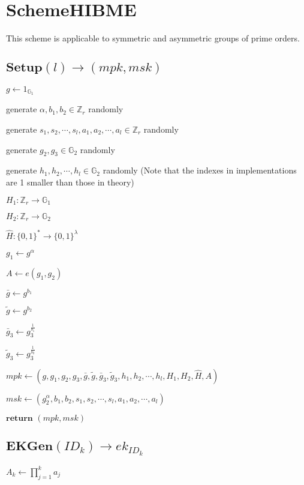\documentclass[a4paper]{article}
\begin{document}
\section{SchemeHIBME}

This scheme is applicable to symmetric and asymmetric groups of prime orders. 

\subsection{$\textbf{Setup}(l) \rightarrow (\textit{mpk}, \textit{msk})$}

$g \gets 1_{\mathbb{G}_1}$

generate $\alpha, b_1, b_2 \in \mathbb{Z}_r$ randomly

generate $s_1, s_2, \cdots, s_l, a_1, a_2, \cdots, a_l \in \mathbb{Z}_r$ randomly

generate $g_2, g_3 \in \mathbb{G}_2$ randomly

generate $h_1, h_2, \cdots, h_l \in \mathbb{G}_2$ randomly (Note that the indexes in implementations are 1 smaller than those in theory)

$H_1:\mathbb{Z}_r \rightarrow \mathbb{G}_1$

$H_2:\mathbb{Z}_r \rightarrow \mathbb{G}_2$

$\hat{H}: \{0, 1\}^* \rightarrow \{0, 1\}^\lambda$

$g_1 \gets g^\alpha$

$A \gets e(g_1, g_2)$

$\bar{g} \gets g^{b_1}$

$\tilde{g} \gets g^{b_2}$

$\bar{g}_3 \gets g_3^{\frac{1}{b_1}}$

$\tilde{g}_3 \gets g_3^{\frac{1}{b_2}}$

$\textit{mpk} \gets (g, g_1, g_2, g_3, \bar{g}, \tilde{g}, \bar{g}_3, \tilde{g}_3, h_1, h_2, \cdots, h_l, H_1, H_2, \hat{H}, A)$

$\textit{msk} \gets (g_2^\alpha, b_1, b_2, s_1, s_2, \cdots, s_l, a_1, a_2, \cdots, a_l)$

$\textbf{return }(\textit{mpk}, \textit{msk})$

\subsection{$\textbf{EKGen}(\textit{ID}_k) \rightarrow \textit{ek}_{\textit{ID}_k}$}

$A_k \gets \prod\limits_{j = 1}^k a_j$
\end{document}
